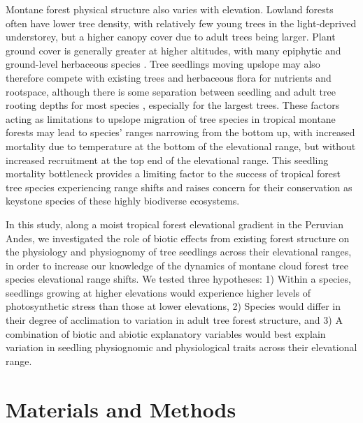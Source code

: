 \documentclass[a4paper, 11pt]{article}
\begin{document}
Montane forest physical structure also varies with elevation. Lowland forests often have lower tree density, with relatively few young trees in the light-deprived understorey, but a higher canopy cover due to adult trees being larger. Plant ground cover is generally greater at higher altitudes, with many epiphytic and ground-level herbaceous species \citep{Martin2010}. Tree seedlings moving upslope may also therefore compete with existing trees and herbaceous flora for nutrients and rootspace, although there is some separation between seedling and adult tree rooting depths for most species \citep{Lewis2000}, especially for the largest trees. These factors acting as limitations to upslope migration of tree species in tropical montane forests may lead to species' ranges narrowing from the bottom up, with increased mortality due to temperature at the bottom of the elevational range, but without increased recruitment at the top end of the elevational range. This seedling mortality bottleneck provides a limiting factor to the success of tropical forest tree species experiencing range shifts and raises concern for their conservation as keystone species of these highly biodiverse ecosystems.

In this study, along a moist tropical forest elevational gradient in the Peruvian Andes, we investigated the role of biotic effects from existing forest structure on the physiology and physiognomy of tree seedlings across their elevational ranges, in order to increase our knowledge of the dynamics of montane cloud forest tree species elevational range shifts. We tested three hypotheses: 1) Within a species, seedlings growing at higher elevations would experience higher levels of photosynthetic stress than those at lower elevations, 2) Species would differ in their degree of acclimation to variation in adult tree forest structure, and 3) A combination of biotic and abiotic explanatory variables would best explain variation in seedling physiognomic and physiological traits across their elevational range.

\section{Materials and Methods}
\end{document}
